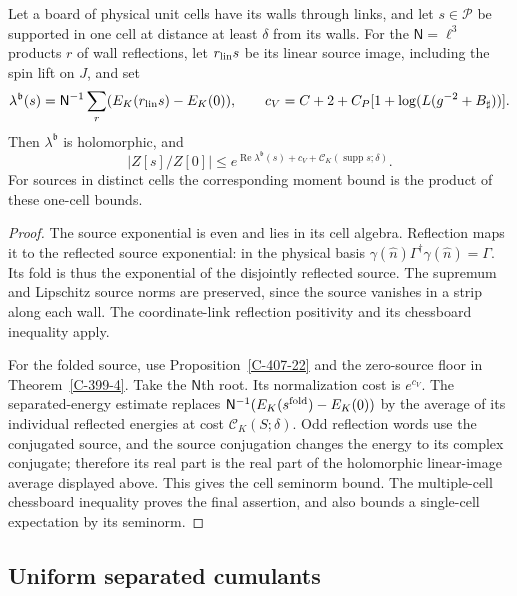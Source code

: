 \documentclass[11pt,letterpaper,reqno]{amsart}
\makeatletter
\theoremstyle{definition}
\newcommand{\ms@minorstart}{%
  \pushQED{\qed}\renewcommand{\qedsymbol}{$\blacksquare$}}
\newenvironment{proposition}[1][]{\ms@minorstart\ms@proposition[#1]}
  {\popQED\endms@proposition}
\theoremstyle{remark}
\makeatother
\begin{document}
\begin{proposition}[A source in one cell]\label{C-407-30}
Let a board of physical unit cells have its walls through
links, and let $s\in\mathcal P$ be supported in one cell
at distance at least $\delta$ from its walls. For the
$\mathsf N=\ell^3$ products $r$ of wall reflections, let
$r_{\rm lin}s$ be its linear source image, including the
spin lift on $J$, and set
\[
 \lambda^{\mathfrak b}(s)=\mathsf N^{-1}
        \sum_r(E_K(r_{\rm lin}s)-E_K(0)),\qquad
 c_V=C+2+C_P[1+\log(L(g^{-2}+B_\sharp))].
\]
Then $\lambda^{\mathfrak b}$ is holomorphic, and
\begin{equation}\label{eq:qcd-cell-source-bound}
 |Z[s]/Z[0]|\le
 e^{\operatorname{Re}\lambda^{\mathfrak b}(s)+c_V+
                 \mathscr C_K(\operatorname{supp}s;\delta)}.
\end{equation}
For sources in distinct cells the corresponding moment
bound is the product of these one-cell bounds.
\end{proposition}
\begin{proof}
The source exponential is even and lies in its cell
algebra. Reflection maps it to the reflected source
exponential: in the physical basis
$\gamma(\hat n)\Gamma^\dagger\gamma(\hat n)=\Gamma$.
Its fold is thus the exponential of the disjointly
reflected source. The supremum and Lipschitz source
norms are preserved, since the source vanishes in a
strip along each wall. The coordinate-link reflection
positivity and its chessboard inequality apply.

For the folded source, use Proposition~\ref{C-407-22}
and the zero-source floor in Theorem~\ref{C-399-4}.
Take the $\mathsf N$th root. Its normalization cost is
$e^{c_V}$. The separated-energy estimate replaces
$\mathsf N^{-1}(E_K(s^{\rm fold})-E_K(0))$ by the
average of its individual reflected energies at cost
$\mathscr C_K(S;\delta)$. Odd reflection words use the
conjugated source, and the source conjugation changes
the energy to its complex conjugate; therefore its real
part is the real part of the holomorphic linear-image
average displayed above. This gives the cell seminorm
bound. The multiple-cell chessboard inequality proves
the final assertion, and also bounds a single-cell
expectation by its seminorm.
\end{proof}

\subsection{Uniform separated cumulants}
\end{document}
